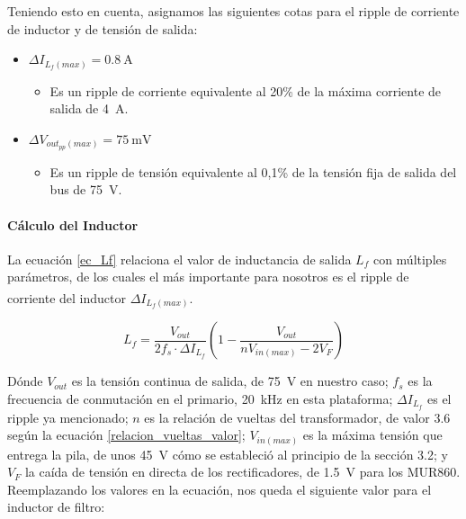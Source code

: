 Teniendo esto en cuenta, asignamos las siguientes cotas para el ripple de corriente de inductor y de tensión de salida:

\begin{itemize}
    \item $\Delta I_{L_f(max)} = \SI[]{0.8}{\ampere}$
    \begin{itemize}
        \item Es un ripple de corriente equivalente al 20\% de la máxima corriente de salida de \SI{4}{\ampere}.
    \end{itemize}
    \item $\Delta V_{out_{pp}(max)} = \SI[]{75}{\milli\volt}$
    \begin{itemize}
        \item Es un ripple de tensión equivalente al 0,1\% de la tensión fija de salida del bus de \SI[]{75}{\volt}.
    \end{itemize}
\end{itemize}

\paragraph{Cálculo del Inductor}

La ecuación \ref{ec_Lf} relaciona el valor de inductancia de salida $L_f$ con múltiples parámetros, de los cuales el más importante para nosotros es el ripple de corriente del inductor $\Delta I_{L_f(max)}$.\textsuperscript{\cite{SoftSwitchPWM}}

\begin{equation}\label{ec_Lf}
    L_f = \frac{V_{out}}{2f_s\cdot\Delta I_{L_f}}\left(1-\frac{V_{out}}{nV_{in(max)}-2V_F}\right)
\end{equation}

Dónde $V_{out}$ es la tensión continua de salida, de \SI[]{75}{\volt} en nuestro caso; $f_s$ es la frecuencia de conmutación en el primario, \SI[]{20}{\kilo\hertz} en esta plataforma; $\Delta I_{L_f}$ es el ripple ya mencionado; $n$ es la relación de vueltas del transformador, de valor \num{3.6} según la ecuación \ref{relacion_vueltas_valor}; $V_{in(max)}$ es la máxima tensión que entrega la pila, de unos \SI[]{45}{\volt} cómo se estableció al principio de la sección 3.2; y $V_F$ la caída de tensión en directa de los rectificadores, de \SI[]{1.5}{\volt} para los MUR860.\\ 

Reemplazando los valores en la ecuación, nos queda el siguiente valor para el inductor de filtro:

